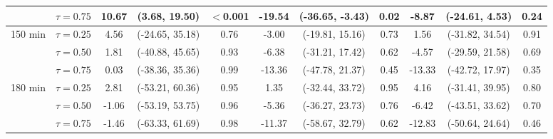 \begin{table}[ht]
{\begin{tabular}{llccccccccc}
 & $\tau=0.75$ & \textbf{10.67} & \textbf{(3.68, 19.50)} & \textbf{$<$0.001} & \textbf{-19.54} & \textbf{(-36.65, -3.43)} & \textbf{0.02} & -8.87 & (-24.61, 4.53) & 0.24 \\
\midrule
\multirow{3}{*}{150 min} & $\tau=0.25$ & 4.56 & (-24.65, 35.18) & 0.76 & -3.00 & (-19.81, 15.16) & 0.73 & 1.56 & (-31.82, 34.54) & 0.91 \\
 & $\tau=0.50$ & 1.81 & (-40.88, 45.65) & 0.93 & -6.38 & (-31.21, 17.42) & 0.62 & -4.57 & (-29.59, 21.58) & 0.69 \\
 & $\tau=0.75$ & 0.03 & (-38.36, 35.36) & 0.99 & -13.36 & (-47.78, 21.37) & 0.45 & -13.33 & (-42.72, 17.97) & 0.35 \\
\midrule
\multirow{3}{*}{180 min} & $\tau=0.25$ & 2.81 & (-53.21, 60.36) & 0.95 & 1.35 & (-32.44, 33.72) & 0.95 & 4.16 & (-31.41, 39.95) & 0.80 \\
 & $\tau=0.50$ & -1.06 & (-53.19, 53.75) & 0.96 & -5.36 & (-36.27, 23.73) & 0.76 & -6.42 & (-43.51, 33.62) & 0.70 \\
 & $\tau=0.75$ & -1.46 & (-63.33, 61.69) & 0.98 & -11.37 & (-58.67, 32.79) & 0.62 & -12.83 & (-50.64, 24.64) & 0.46 \\
\bottomrule
\end{tabular}%
}
\end{table}
